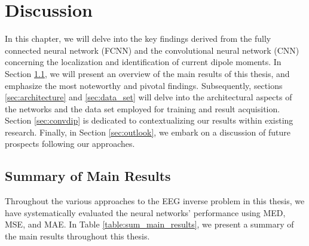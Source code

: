 \documentclass[a4paper, UKenglish, 11pt]{uiomaster}
\begin{document}
\chapter{Discussion}
In this chapter, we will delve into the key findings derived from the fully connected neural network (FCNN) and the convolutional neural network (CNN) concerning the localization and identification of current dipole moments. In Section \ref{sec:results}, we will present an overview of the main results of this thesis, and emphasize the most noteworthy and pivotal findings. Subsequently, sections \ref{sec:architecture} and \ref{sec:data_set} will delve into the architectural aspects of the networks and the data set employed for training and result acquisition. Section \ref{sec:convdip} is dedicated to contextualizing our results within existing research. Finally, in Section \ref{sec:outlook}, we embark on a discussion of future prospects following our approaches.



\section{Summary of Main Results} \label{sec:results}
Throughout the various approaches to the EEG inverse problem in this thesis, we have systematically evaluated the neural networks' performance using MED, MSE, and MAE. In Table \ref{table:sum_main_results}, we present a summary of the main results throughout this thesis.
\end{document}
